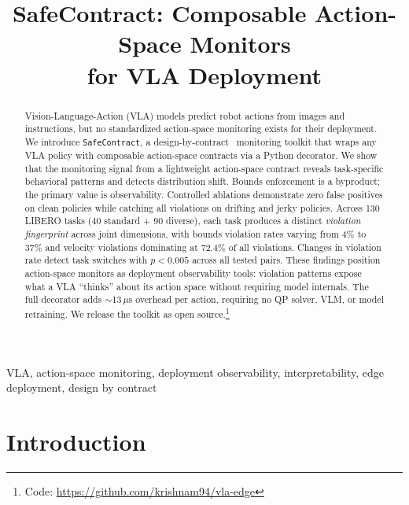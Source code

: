 \documentclass[conference]{IEEEtran}
\begin{document}
\title{SafeContract: Composable Action-Space Monitors\\for VLA Deployment}

\author{
}

\maketitle

\begin{abstract}
Vision-Language-Action (VLA) models predict robot actions from images and instructions, but no standardized action-space monitoring exists for their deployment.
We introduce \texttt{SafeContract}, a design-by-contract~\cite{meyer1992} monitoring toolkit that wraps any VLA policy with composable action-space contracts via a Python decorator.
We show that the monitoring signal from a lightweight action-space contract reveals task-specific behavioral patterns and detects distribution shift.
Bounds enforcement is a byproduct; the primary value is observability.
Controlled ablations demonstrate zero false positives on clean policies while catching all violations on drifting and jerky policies.
Across 130 LIBERO tasks (40 standard + 90 diverse), each task produces a distinct \emph{violation fingerprint} across joint dimensions, with bounds violation rates varying from 4\% to 37\% and velocity violations dominating at 72.4\% of all violations.
Changes in violation rate detect task switches with $p < 0.005$ across all tested pairs.
These findings position action-space monitors as deployment observability tools: violation patterns expose what a VLA ``thinks'' about its action space without requiring model internals.
The full decorator adds ${\sim}$13\,$\mu$s overhead per action, requiring no QP solver, VLM, or model retraining.
We release the toolkit as open source.\footnote{Code: \url{https://github.com/krishnam94/vla-edge}}
\end{abstract}

\begin{IEEEkeywords}
VLA, action-space monitoring, deployment observability, interpretability, edge deployment, design by contract
\end{IEEEkeywords}


\section{Introduction}
\end{document}
